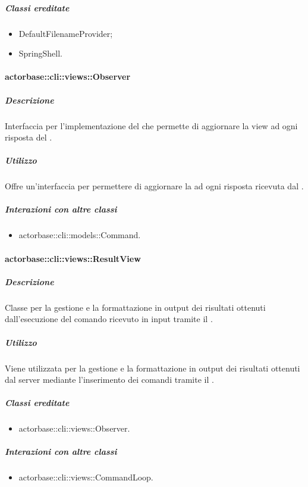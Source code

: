 \documentclass{scalatekids-article}
\begin{document}
\subparagraph{Classi ereditate}

\begin{itemize}
\item DefaultFilenameProvider;
\item SpringShell.
\end{itemize}

\paragraph{actorbase::cli::views::Observer}

\subparagraph{Descrizione}

Interfaccia per l'implementazione del   che permette di aggiornare la view ad ogni risposta del .

\subparagraph{Utilizzo}

Offre un'interfaccia per permettere di aggiornare la  ad ogni risposta ricevuta dal .

\subparagraph{Interazioni con altre classi}

\begin{itemize}
\item actorbase::cli::models::Command.
\end{itemize}

\paragraph{actorbase::cli::views::ResultView}

\subparagraph{Descrizione}

Classe per la gestione e la formattazione in output dei risultati ottenuti dall'esecuzione del comando ricevuto in input tramite il  .

\subparagraph{Utilizzo}

Viene utilizzata per la gestione e la formattazione in output dei risultati ottenuti dal server mediante l'inserimento dei comandi tramite il  .

\subparagraph{Classi ereditate}

\begin{itemize}
\item actorbase::cli::views::Observer.
\end{itemize}

\subparagraph{Interazioni con altre classi}

\begin{itemize}
\item actorbase::cli::views::CommandLoop.
\end{itemize}
\end{document}
